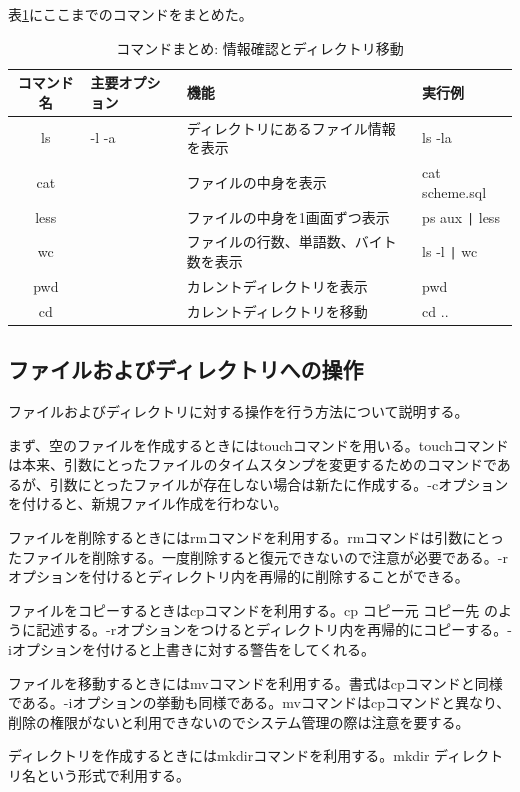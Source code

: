 \documentclass[dvipdfmx,12pt,a4j]{jarticle}
\begin{document}
表\ref{table:command:info}にここまでのコマンドをまとめた。
\begin{table}[H]
  \caption{コマンドまとめ: 情報確認とディレクトリ移動}
  \label{table:command:info}
  \begin{tabular}{|c|l|l|l|}
    \hline
    コマンド名 & 主要オプション & 機能 & 実行例\\
    \hline \hline
    ls & -l -a & ディレクトリにあるファイル情報を表示 & ls -la \\
    cat & & ファイルの中身を表示 & cat scheme.sql \\
    less & & ファイルの中身を1画面ずつ表示 & ps aux \verb+|+ less \\
    wc & & ファイルの行数、単語数、バイト数を表示 & ls -l \verb+|+ wc \\
    pwd & & カレントディレクトリを表示 & pwd \\
    cd & & カレントディレクトリを移動 & cd ..\\
    \hline
  \end{tabular}
\end{table}

\subsection{ファイルおよびディレクトリへの操作}
ファイルおよびディレクトリに対する操作を行う方法について説明する。

まず、空のファイルを作成するときにはtouchコマンドを用いる。touchコマンドは本来、引数にとったファイルのタイムスタンプを変更するためのコマンドであるが、引数にとったファイルが存在しない場合は新たに作成する。-cオプションを付けると、新規ファイル作成を行わない。

ファイルを削除するときにはrmコマンドを利用する。rmコマンドは引数にとったファイルを削除する。一度削除すると復元できないので注意が必要である。-rオプションを付けるとディレクトリ内を再帰的に削除することができる。

ファイルをコピーするときはcpコマンドを利用する。cp コピー元 コピー先 のように記述する。-rオプションをつけるとディレクトリ内を再帰的にコピーする。-iオプションを付けると上書きに対する警告をしてくれる。

ファイルを移動するときにはmvコマンドを利用する。書式はcpコマンドと同様である。-iオプションの挙動も同様である。mvコマンドはcpコマンドと異なり、削除の権限がないと利用できないのでシステム管理の際は注意を要する。

ディレクトリを作成するときにはmkdirコマンドを利用する。mkdir ディレクトリ名という形式で利用する。
\end{document}
